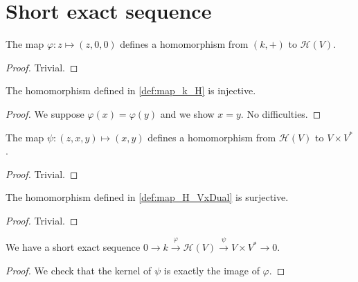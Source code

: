 \section{Short exact sequence}

\begin{definition}
    \label{def:map_k_H}
    \leanok 

    The map $\varphi:z\mapsto (z,0,0)$ defines a homomorphism from
    $(k,+)$ to $\mathcal{H}(V)$.
    \begin{proof}
        \leanok
        Trivial.
    \end{proof}
\end{definition}

\begin{proposition}
    \label{prop:inj_map_k_H}
    \leanok 

    The homomorphism defined in \ref{def:map_k_H} is injective.
    \begin{proof}
        \leanok
        We suppose $\varphi(x)=\varphi(y)$ and we show $x=y$. No difficulties.
    \end{proof}
\end{proposition}

\begin{definition}
    \label{def:map_H_VxDual}
    \leanok 

    The map $\psi:(z,x,y)\mapsto (x,y)$ defines a homomorphism from 
    $\mathcal{H}(V)$ to $V\times V^*$.
    \begin{proof}
        \leanok
        Trivial.
    \end{proof}
\end{definition}

\begin{proposition}
    \label{prop:surj_map_H_VxV*}
    \leanok 

    The homomorphism defined in \ref{def:map_H_VxDual} is surjective.
    \begin{proof}
        \leanok
        Trivial.
    \end{proof}
\end{proposition}

\begin{proposition}
    \label{exact_seq_h}
    \leanok 

    We have a short exact sequence $0\rightarrow k \stackrel{\varphi}{\rightarrow} \mathcal{H}(V) \stackrel{\psi}{\rightarrow}
    V\times V^* \rightarrow 0$.
    \begin{proof}
        \leanok
        We check that the kernel of $\psi$ is exactly the image of $\varphi$.
    \end{proof}
\end{proposition}

